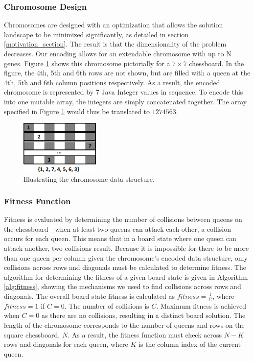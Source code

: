 \documentclass{sig-alternate}
\begin{document}
\subsubsection{Chromosome Design}
Chromosomes are designed with an optimization that allows the solution landscape to be minimized significantly, as detailed in section \ref{motivation_section}. The result is that the dimensionality of the problem decreases. Our encoding allows for an extendable chromosome with up to N genes. Figure \ref{fig:chromosome} shows this chromosome pictorially for a $7 \times 7$ chessboard. In the figure, the 4th, 5th and 6th rows are not shown, but are filled with a queen at the 4th, 5th and 6th column positions respectively. As a result, the encoded chromosome is represented by 7 Java Integer values in sequence. To encode this into one mutable array, the integers are simply concatenated together. The array specified in Figure \ref{fig:chromosome} would thus be translated to $1274563$.

\begin{figure}[h]
\centering
\includegraphics[width=0.35\textwidth]{chromosome.png}
\vspace{-12pt}
\caption{Illustrating the chromosome data structure.}
\label{fig:chromosome}
\end{figure}

\subsubsection{Fitness Function}
Fitness is evaluated by determining the number of collisions between queens on the chessboard - when at least two queens can attack each other, a collision occurs for each queen. This means that in a board state where one queen can attack another, two collisions result. Because it is impossible for there to be more than one queen per column given the chromosome's encoded data structure, only collisions across rows and diagonals must be calculated to determine fitness. The algorithm for determining the fitness of a given board state is given in Algorithm \ref{alg:fitness}, showing the mechanisms we used to find collisions across rows and diagonals. The overall board state fitness is calculated as $fitness = \frac{1}{C}$, where $fitness = 1$ if $C = 0$. The number of collisions is $C$. Maximum fitness is achieved when $C = 0$ as there are no collisions, resulting in a distinct board solution. The length of the chromosome corresponds to the number of queens and rows on the square chessboard, $N$. As a result, the fitness function must check across $N - K$ rows and diagonals for each queen, where $K$ is the column index of the current queen.
 
\end{document}
